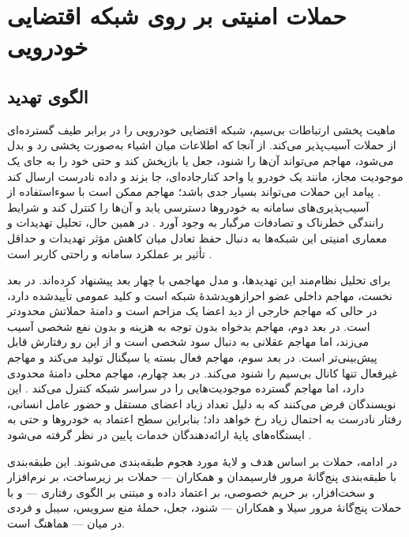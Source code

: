 \section{حملات امنیتی بر روی شبکه اقتضایی خودرویی}

\subsection{الگوی تهدید}

ماهیت پخشی ارتباطات بی‌سیم، شبکه اقتضایی خودرویی را در برابر طیف گسترده‌ای از حملات آسیب‌پذیر می‌کند. از آنجا که اطلاعات میان اشیاء  به‌صورت پخشی رد و بدل می‌شود، مهاجم می‌تواند آن‌ها را شنود، جعل یا بازپخش کند و حتی خود را به جای یک موجودیت مجاز، مانند یک خودرو یا واحد کنارجاده‌ای، جا بزند و داده نادرست ارسال کند \cite{farsimadanReviewSecurityChallenges2025}. پیامد این حملات می‌تواند بسیار جدی باشد؛ مهاجم ممکن است با سوءاستفاده از آسیب‌پذیری‌های سامانه به خودروها دسترسی یابد و آن‌ها را کنترل کند و شرایط رانندگی خطرناک و تصادفات مرگبار به وجود آورد \cite{farsimadanReviewSecurityChallenges2025}. در همین حال، تحلیل تهدیدات و معماری امنیتی این شبکه‌ها به دنبال حفظ تعادل میان کاهش مؤثر تهدیدات و حداقل تأثیر بر عملکرد سامانه و راحتی کاربر است \cite{SecuringVehicularAd,VanetSecurityPrivacy}.

برای تحلیل نظام‌مند این تهدیدها،  و  مدل مهاجمی با چهار بعد پیشنهاد کرده‌اند. در بعد نخست، مهاجم داخلی عضو احرازهوید‌شدهٔ شبکه است و کلید عمومی تأییدشده دارد، در حالی که مهاجم خارجی از دید اعضا یک مزاحم است و دامنهٔ حملاتش محدودتر است. در بعد دوم، مهاجم بدخواه بدون توجه به هزینه و بدون نفع شخصی آسیب می‌زند، اما مهاجم عقلانی به دنبال سود شخصی است و از این رو رفتارش قابل پیش‌بینی‌تر است. در بعد سوم، مهاجم فعال بسته یا سیگنال تولید می‌کند و مهاجم غیرفعال تنها کانال بی‌سیم را شنود می‌کند. در بعد چهارم، مهاجم محلی دامنهٔ محدودی دارد، اما مهاجم گسترده موجودیت‌هایی را در سراسر شبکه کنترل می‌کند \cite{SecuringVehicularAd}. این نویسندگان فرض می‌کنند که به دلیل تعداد زیاد اعضای مستقل و حضور عامل انسانی، رفتار نادرست به احتمال زیاد رخ خواهد داد؛ بنابراین سطح اعتماد به خودروها و حتی به ایستگاه‌های پایهٔ ارائه‌دهندگان خدمات پایین در نظر گرفته می‌شود \cite{SecuringVehicularAd}.

در ادامه، حملات بر اساس هدف و لایهٔ مورد هجوم طبقه‌بندی می‌شوند. این طبقه‌بندی با طبقه‌بندی پنج‌گانهٔ مرور فارسیمدان و همکاران — حملات بر زیرساخت، بر نرم‌افزار و سخت‌افزار، بر حریم خصوصی، بر اعتماد داده و مبتنی بر الگوی رفتاری \cite{farsimadanReviewSecurityChallenges2025} — و با حملات پنج‌گانهٔ مرور سیلا و همکاران — شنود، جعل، حملهٔ منع سرویس، سیبل و فردی در میان \cite{VanetSecurityPrivacy} — هماهنگ است.

